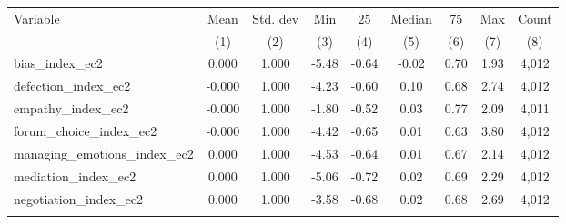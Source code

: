 \begin{tabular}{lcccccccc}
\hline \noalign{\smallskip}Variable & Mean & Std. dev & Min & 25 & Median & 75 & Max & Count\\
 & (1) & (2) & (3) & (4) & (5) & (6) & (7) & (8)\\
\noalign{\smallskip}\hline \noalign{\smallskip}bias_index_ec2 & 0.000 & 1.000 & -5.48 & -0.64 & -0.02 & 0.70 & 1.93 & 4,012\\
defection_index_ec2 & -0.000 & 1.000 & -4.23 & -0.60 & 0.10 & 0.68 & 2.74 & 4,012\\
empathy_index_ec2 & -0.000 & 1.000 & -1.80 & -0.52 & 0.03 & 0.77 & 2.09 & 4,011\\
forum_choice_index_ec2 & -0.000 & 1.000 & -4.42 & -0.65 & 0.01 & 0.63 & 3.80 & 4,012\\
managing_emotions_index_ec2 & 0.000 & 1.000 & -4.53 & -0.64 & 0.01 & 0.67 & 2.14 & 4,012\\
mediation_index_ec2 & 0.000 & 1.000 & -5.06 & -0.72 & 0.02 & 0.69 & 2.29 & 4,012\\
negotiation_index_ec2 & 0.000 & 1.000 & -3.58 & -0.68 & 0.02 & 0.68 & 2.69 & 4,012\\
\noalign{\smallskip}\hline\end{tabular}
